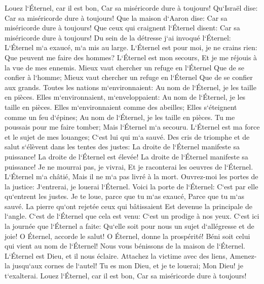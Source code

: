 \verse Louez l`Éternel, car il est bon, Car sa miséricorde dure à toujours! 
\verse Qu`Israël dise: Car sa miséricorde dure à toujours! 
\verse Que la maison d`Aaron dise: Car sa miséricorde dure à toujours! 
\verse Que ceux qui craignent l`Éternel disent: Car sa miséricorde dure à toujours! 
\verse Du sein de la détresse j`ai invoqué l`Éternel: L`Éternel m`a exaucé, m`a mis au large. 
\verse L`Éternel est pour moi, je ne crains rien: Que peuvent me faire des hommes? 
\verse L`Éternel est mon secours, Et je me réjouis à la vue de mes ennemis. 
\verse Mieux vaut chercher un refuge en l`Éternel Que de se confier à l`homme; 
\verse Mieux vaut chercher un refuge en l`Éternel Que de se confier aux grands. 
\verse Toutes les nations m`environnaient: Au nom de l`Éternel, je les taille en pièces. 
\verse Elles m`environnaient, m`enveloppaient: Au nom de l`Éternel, je les taille en pièces. 
\verse Elles m`environnaient comme des abeilles; Elles s`éteignent comme un feu d`épines; Au nom de l`Éternel, je les taille en pièces. 
\verse Tu me poussais pour me faire tomber; Mais l`Éternel m`a secouru. 
\verse L`Éternel est ma force et le sujet de mes louanges; C`est lui qui m`a sauvé. 
\verse Des cris de triomphe et de salut s`élèvent dans les tentes des justes: La droite de l`Éternel manifeste sa puissance! 
\verse La droite de l`Éternel est élevée! La droite de l`Éternel manifeste sa puissance! 
\verse Je ne mourrai pas, je vivrai, Et je raconterai les oeuvres de l`Éternel. 
\verse L`Éternel m`a châtié, Mais il ne m`a pas livré à la mort. 
\verse Ouvrez-moi les portes de la justice: J`entrerai, je louerai l`Éternel. 
\verse Voici la porte de l`Éternel: C`est par elle qu`entrent les justes. 
\verse Je te loue, parce que tu m`as exaucé, Parce que tu m`as sauvé. 
\verse La pierre qu`ont rejetée ceux qui bâtissaient Est devenue la principale de l`angle. 
\verse C`est de l`Éternel que cela est venu: C`est un prodige à nos yeux. 
\verse C`est ici la journée que l`Éternel a faite: Qu`elle soit pour nous un sujet d`allégresse et de joie! 
\verse O Éternel, accorde le salut! O Éternel, donne la prospérité! 
\verse Béni soit celui qui vient au nom de l`Éternel! Nous vous bénissons de la maison de l`Éternel. 
\verse L`Éternel est Dieu, et il nous éclaire. Attachez la victime avec des liens, Amenez-la jusqu`aux cornes de l`autel! 
\verse Tu es mon Dieu, et je te louerai; Mon Dieu! je t`exalterai. 
\verse Louez l`Éternel, car il est bon, Car sa miséricorde dure à toujours! 

\chapter{}


